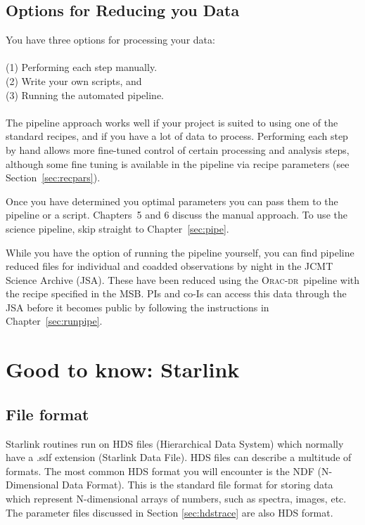 \documentclass[twoside,11pt]{article}
\newcommand{\htmladdnormallink}[2]{#1}
\newcommand{\htmlref}[2]{#1}
\newcommand{\latexhtml}[2]{#1}
\newcommand{\xlabel}[1]{}
\renewcommand{\_}{\texttt{\symbol{95}}}
\newcommand{\oracdr}{\htmladdnormallink{\textsc{Orac-dr}}{http://www.oracdr.org/oracdr}}
\newcommand{\cref}[3]{\latexhtml{#1~\ref{#2}}{\htmlref{#3}{#2}}}
\begin{document}
\subsection{\xlabel{software}Options for Reducing you Data}

You have three options for processing your data:
\\\\
(1) Performing each step manually.\\
(2) Write your own scripts, and \\
(3) Running the automated pipeline.
\\\\
The pipeline approach works well if your project is suited to using one of the
standard recipes, and if you have a lot of data to process. Performing
each step by hand allows more fine-tuned control of certain
processing and analysis steps, although some fine tuning is available in the pipeline via recipe parameters (see \cref{Section}{sec:recpars}{Recipe parameters}). 

Once you have determined you optimal parameters you can pass them to the
pipeline or a script. Chapters~5 and 6 discuss the manual approach. To use the science pipeline, skip
straight to \cref{Chapter}{sec:pipe}{The ACSIS Pipeline}.

While you have the option of running the pipeline yourself, you can find pipeline reduced files for individual and coadded observations by night in the \htmladdnormallink{JCMT Science Archive}{http://www3.cadc-ccda.hia-iha.nrc-cnrc.gc.ca/jcmt/} (JSA). These have been reduced using the \oracdr\ pipeline with the recipe specified in the MSB. PIs and co-Is can access this data through the JSA before it becomes public by following the instructions in \cref{Chapter}{sec:runpipe}{The ACSIS Pipeline}.

\newpage
\section{\xlabel{starlink}Good to know: Starlink}
\label{sec:starlink}
\subsection{File format}
\label{sec:format}
Starlink routines run on HDS files (Hierarchical Data System) which normally have a .sdf extension (Starlink Data File). HDS files can describe a multitude of formats. The most common HDS format you will encounter is the NDF (N-Dimensional Data Format). This is the standard file format for storing data which represent N-dimensional arrays of numbers, such as spectra, images, etc. The parameter files discussed in Section \ref{sec:hdstrace} are also HDS format.
\end{document}
